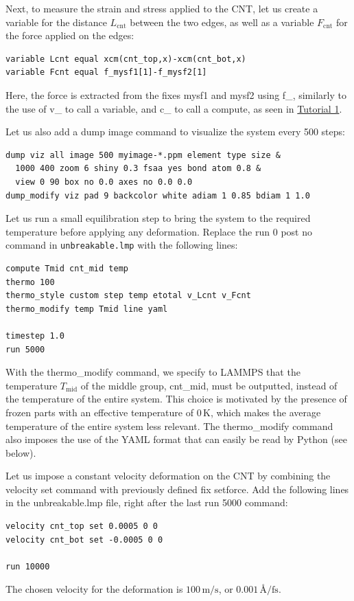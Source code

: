 \documentclass[9pt,tutorial]{livecoms}
\newcommand{\lmpcmd}[1]{\hspace{0pt}\colorbox{listing}{\textcolor{command}{\small{#1}}}\hspace{0pt}} %
\newcommand{\flecmd}[1]{\textcolor{command}{\texttt{#1}}} %
\begin{document}
Next, to measure the strain and stress applied to the CNT, let us create a
variable for the distance $L_\text{cnt}$ between the two edges,
as well as a variable $F_\text{cnt}$ for the force applied on the edges:
\begin{lstlisting}
variable Lcnt equal xcm(cnt_top,x)-xcm(cnt_bot,x)
variable Fcnt equal f_mysf1[1]-f_mysf2[1]
\end{lstlisting}
Here, the force is extracted from the fixes \lmpcmd{mysf1} and \lmpcmd{mysf2}
using \lmpcmd{f\_}, similarly to the use of \lmpcmd{v\_} to call a variable,
and \lmpcmd{c\_} to call a compute, as seen in \hyperref[lennard-jones-label]{Tutorial 1}.

Let us also add a \lmpcmd{dump image} command to visualize the system
every 500 steps:
\begin{lstlisting}
dump viz all image 500 myimage-*.ppm element type size &
  1000 400 zoom 6 shiny 0.3 fsaa yes bond atom 0.8 &
  view 0 90 box no 0.0 axes no 0.0 0.0
dump_modify viz pad 9 backcolor white adiam 1 0.85 bdiam 1 1.0
\end{lstlisting}
Let us run a small equilibration step to bring the system to the required
temperature before applying any deformation.  Replace the \lmpcmd{run 0 post no}
command in \flecmd{unbreakable.lmp} with the following lines:
\begin{lstlisting}
compute Tmid cnt_mid temp
thermo 100
thermo_style custom step temp etotal v_Lcnt v_Fcnt
thermo_modify temp Tmid line yaml

timestep 1.0
run 5000
\end{lstlisting}
With the \lmpcmd{thermo\_modify} command, we specify to LAMMPS that the
temperature $T_\mathrm{mid}$ of the middle group, \lmpcmd{cnt\_mid},
must be outputted, instead of the temperature of the entire system.
This choice is motivated by the presence of
frozen parts with an effective temperature of 0\,K, which makes the average
temperature of the entire system less relevant.  The \lmpcmd{thermo\_modify}
command also imposes the use of the YAML format that can easily be read by
Python (see below).

Let us impose a constant velocity deformation on the CNT
by combining the \lmpcmd{velocity set} command with previously defined
\lmpcmd{fix setforce}.  Add the following lines in the \lmpcmd{unbreakable.lmp}
file, right after the last \lmpcmd{run 5000} command:
\begin{lstlisting}
velocity cnt_top set 0.0005 0 0
velocity cnt_bot set -0.0005 0 0

run 10000
\end{lstlisting}
The chosen velocity for the deformation is $100\,\text{m/s}$, or
$0.001\,\text{\AA{}/fs}$.
\end{document}
